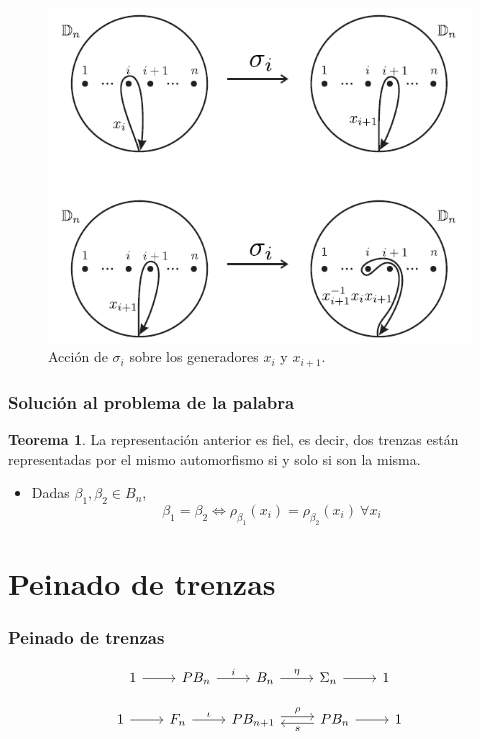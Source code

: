 \documentclass{beamer}
\theoremstyle{definition}
\newtheorem{teorema}{Teorema}
\begin{document}
\begin{frame}
\begin{figure}[h!]
\includegraphics[scale=0.5]{Imagenes/auto.png}
\caption{Acción de $\sigma_i$ sobre los generadores $x_i$ y $x_{i+1}$.}
\end{figure}
\end{frame}

\begin{frame}
\frametitle{Solución al problema de la palabra}
\begin{teorema}
La representación anterior es fiel, es decir, dos trenzas están representadas por el mismo automorfismo si y solo si son la misma.
\end{teorema}

\begin{itemize}
\item Dadas $\beta_1,\beta_2\in B_n$, 
$$\beta_1=\beta_2\Leftrightarrow \rho_{\beta_1}(x_i)=\rho_{\beta_2}(x_i)\ \forall x_i$$
\end{itemize}
\end{frame}

\section{Peinado de trenzas}
\begin{frame}[fragile]
\frametitle{Peinado de trenzas}
\[
\begin{tikzcd}
1\arrow[r]& PB_n\arrow[r, "i"] & B_n\arrow[r,"\eta"]& \Sigma_n\arrow[r] & 1
\end{tikzcd}
\]

\[
\begin{tikzcd}
1\arrow[r]& F_n\arrow[r, "\iota"] & PB_{n+1}\arrow[r,"\rho", shift left]& \arrow[l,"s",shift left]PB_n\arrow[r] & 1
\end{tikzcd}
\]
\end{frame}
\end{document}
